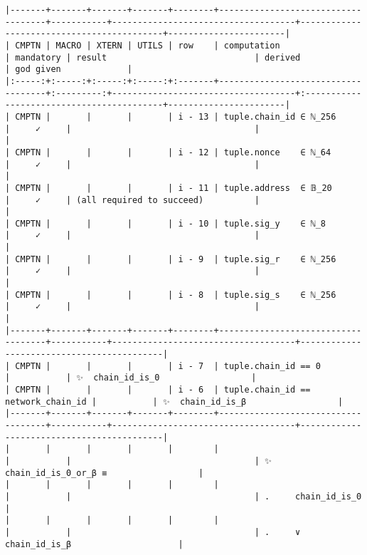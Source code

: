 \documentclass[varwidth=\maxdimen,margin=0.5cm,multi={verbatim}]{standalone}
\begin{document}
\begin{verbatim}
|-------+-------+-------+-------+--------+------------------------------------+-----------+------------------------------------+-------------------------------------------+-----------------------|
| CMPTN | MACRO | XTERN | UTILS | row    | computation                        | mandatory | result                             | derived                                   | god given             |
|:-----:+:-----:+:-----:+:-----:+:-------+------------------------------------+:---------:+------------------------------------+:------------------------------------------+-----------------------|
| CMPTN |       |       |       | i - 13 | tuple.chain_id ∈ ℕ_256             |     ✓     |                                    |                                           |
| CMPTN |       |       |       | i - 12 | tuple.nonce    ∈ ℕ_64              |     ✓     |                                    |                                           |
| CMPTN |       |       |       | i - 11 | tuple.address  ∈ 𝔹_20              |     ✓     | (all required to succeed)          |                                           |
| CMPTN |       |       |       | i - 10 | tuple.sig_y    ∈ ℕ_8               |     ✓     |                                    |                                           |
| CMPTN |       |       |       | i - 9  | tuple.sig_r    ∈ ℕ_256             |     ✓     |                                    |                                           |
| CMPTN |       |       |       | i - 8  | tuple.sig_s    ∈ ℕ_256             |     ✓     |                                    |                                           |
|-------+-------+-------+-------+--------+------------------------------------+-----------+------------------------------------+-------------------------------------------|
| CMPTN |       |       |       | i - 7  | tuple.chain_id == 0                |           | ✨  chain_id_is_0                  |
| CMPTN |       |       |       | i - 6  | tuple.chain_id == network_chain_id |           | ✨  chain_id_is_β                  |
|-------+-------+-------+-------+--------+------------------------------------+-----------+------------------------------------+-------------------------------------------|
|       |       |       |       |        |                                    |           |                                    | ✨  chain_id_is_0_or_β ≡                  |
|       |       |       |       |        |                                    |           |                                    | .     chain_id_is_0                       |
|       |       |       |       |        |                                    |           |                                    | .     ∨ chain_id_is_β                     |

\end{verbatim}
\end{document}
